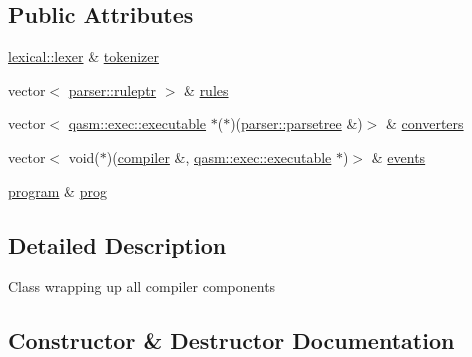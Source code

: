 \subsection*{Public Attributes}
\begin{DoxyCompactItemize}
\item 
\hyperlink{classlexical_1_1lexer}{lexical\+::lexer} \& \hyperlink{classcompiler_a888ac16dbb82fa8a9500633addcd22ba}{tokenizer}
\item 
vector$<$ \hyperlink{namespaceparser_a85b2df48287fddaca144a5f6c01b4761}{parser\+::ruleptr} $>$ \& \hyperlink{classcompiler_a1b712963929882f359df919ce73bbf4e}{rules}
\item 
vector$<$ \hyperlink{classqasm_1_1exec_1_1executable}{qasm\+::exec\+::executable} $\ast$($\ast$)(\hyperlink{structparser_1_1parsetree}{parser\+::parsetree} \&)$>$ \& \hyperlink{classcompiler_a76cbb22ce5238f2fd9b3946f541dba0c}{converters}
\item 
vector$<$ void($\ast$)(\hyperlink{classcompiler}{compiler} \&, \hyperlink{classqasm_1_1exec_1_1executable}{qasm\+::exec\+::executable} $\ast$)$>$ \& \hyperlink{classcompiler_aa9d1b362adff0ca48511cf824ca1fe4c}{events}
\item 
\hyperlink{classprogram}{program} \& \hyperlink{classcompiler_a801700690bf711169679cb6ca890168a}{prog}
\end{DoxyCompactItemize}


\subsection{Detailed Description}
Class wrapping up all compiler components 

\subsection{Constructor \& Destructor Documentation}
